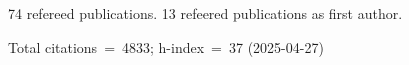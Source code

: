 74 refereed publications. 13 refeered publications as first author.

Total citations~=~4833; h-index~=~37 (2025-04-27)